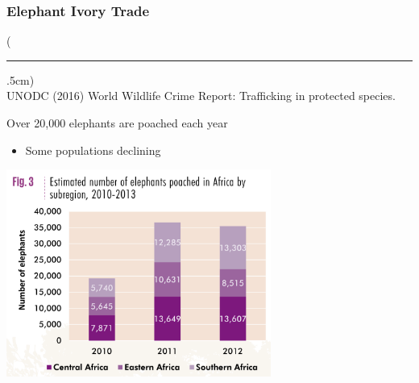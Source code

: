 \documentclass[10pt]{beamer}
\newenvironment{reference}[2]{%
	\begin{textblock*}{\textwidth}(#1,#2)
		\tiny\bgroup\color{gray}}{\egroup\end{textblock*}}
\begin{document}
\begin{frame}[t]
\frametitle{Elephant Ivory Trade}
\vspace{0.5cm}

	\begin{reference}{4mm}{92mm}
		\rule{1.5cm}{0.25pt}\\
		UNODC (2016) World Wildlife Crime Report: Trafficking in protected species.
	\end{reference}
	
	Over 20,000 elephants are poached each year\\
		\medskip
		\begin{itemize}
			\item Some populations declining
			\medskip
		\end{itemize}
	
	\vspace{0.25cm}
	
	\begin{center}
		\includegraphics[width=0.65\textwidth]{figures/ePoaching1.png}
	\end{center}
\end{frame}
\end{document}
